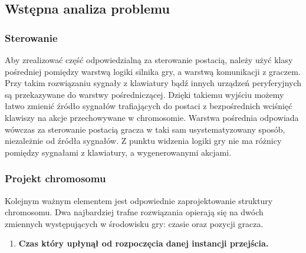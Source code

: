 \subsection{Wstępna analiza problemu}
\begin{par}
	\subsubsection{Sterowanie}
	\begin{par}
	Aby zrealizować część odpowiedzialną za sterowanie postacią, należy użyć klasy pośredniej pomiędzy warstwą logiki silnika gry, a warstwą komunikacji z graczem.
	Przy takim rozwiązaniu sygnały z klawiatury bądź innych urządzeń peryferyjnych są przekazywane do warstwy pośredniczącej.
	Dzięki takiemu wyjściu możemy łatwo zmienić źródło sygnałów trafiających do postaci z bezpośrednich wciśnięć klawiszy na akcje przechowywane w chromosomie.
	Warstwa pośrednia odpowiada wówczas za sterowanie postacią gracza w taki sam usystematyzowany sposób, niezależnie od źródła sygnałów. 
	Z punktu widzenia logiki gry nie ma różnicy pomiędzy sygnałami z klawiatury, a wygenerowanymi akcjami.
	\end{par}
	
	\subsubsection{Projekt chromosomu}
	Kolejnym ważnym elementem jest odpowiednie zaprojektowanie struktury chromosomu. 
	Dwa najbardziej trafne rozwiązania opierają się na dwóch zmiennych występujących w środowisku gry: czasie oraz pozycji gracza.
	\begin{enumerate}
	\item
	{\bf Czas który upłynął od rozpoczęcia danej instancji przejścia. }
	\begin{par}


\end{par}
\end{enumerate}
\end{par}
